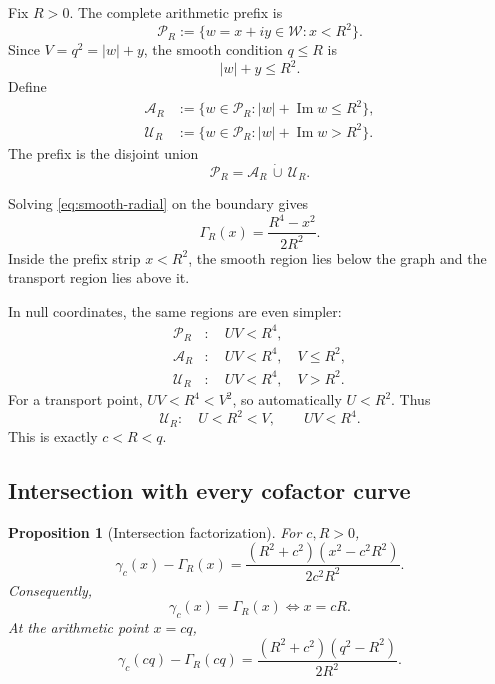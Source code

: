 \documentclass[11pt]{article}
\newtheorem{proposition}[theorem]{Proposition}
\theoremstyle{definition}
\newcommand{\1}{\mathbf{1}}
\newcommand{\Impart}{\operatorname{Im}}
\begin{document}
Fix $R>0$.  The complete arithmetic prefix is
\begin{equation}
 \mathscr P_R
 :=\{w=x+iy\in\mathscr W:x<R^2\}.
 \label{eq:prefix-region}
\end{equation}
Since $V=q^2=|w|+y$, the smooth condition $q\le R$ is
\begin{equation}
 |w|+y\le R^2.
 \label{eq:smooth-radial}
\end{equation}
Define
\begin{align}
 \mathscr A_R
 &:={\{w\in\mathscr P_R:|w|+\Impart w\le R^2\}},
 \label{eq:A-region}\\
 \mathscr U_R
 &:={\{w\in\mathscr P_R:|w|+\Impart w>R^2\}}.
 \label{eq:U-region}
\end{align}
The prefix is the disjoint union
\begin{equation}
 \mathscr P_R=\mathscr A_R\,\dot\cup\,\mathscr U_R.
 \label{eq:region-partition}
\end{equation}

Solving \cref{eq:smooth-radial} on the boundary gives
\begin{equation}
 \boxed{
 \Gamma_R(x)=\frac{R^4-x^2}{2R^2}.
 }
 \label{eq:Gamma-R}
\end{equation}
Inside the prefix strip $x<R^2$, the smooth region lies below the graph and the transport region lies above it.

In null coordinates, the same regions are even simpler:
\begin{align}
 \mathscr P_R&:\quad UV<R^4,
 \label{eq:prefix-UV}\\
 \mathscr A_R&:\quad UV<R^4,\quad V\le R^2,
 \label{eq:smooth-UV}\\
 \mathscr U_R&:\quad UV<R^4,\quad V>R^2.
 \label{eq:transport-UV}
\end{align}
For a transport point, $UV<R^4<V^2$, so automatically $U<R^2$.  Thus
\begin{equation}
 \mathscr U_R:\quad U<R^2<V,
 \qquad
 UV<R^4.
 \label{eq:transport-null-clean}
\end{equation}
This is exactly $c<R<q$.

\subsection{Intersection with every cofactor curve}

\begin{proposition}[Intersection factorization]
\label{prop:intersection-factorization}
For $c,R>0$,
\begin{equation}
 \gamma_c(x)-\Gamma_R(x)
 =
 \frac{(R^2+c^2)(x^2-c^2R^2)}{2c^2R^2}.
 \label{eq:curve-gap}
\end{equation}
Consequently,
\begin{equation}
 \gamma_c(x)=\Gamma_R(x)
 \iff x=cR.
 \label{eq:curve-intersection}
\end{equation}
At the arithmetic point $x=cq$,
\begin{equation}
 \gamma_c(cq)-\Gamma_R(cq)
 =
 \frac{(R^2+c^2)(q^2-R^2)}{2R^2}.
 \label{eq:point-gap}
\end{equation}
\end{proposition}
\end{document}
